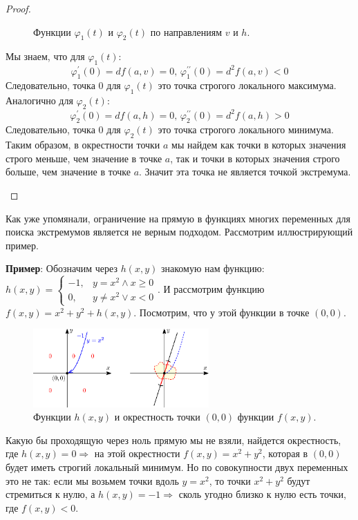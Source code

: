 \documentclass[12pt]{article}
\theoremstyle{definition}
\begin{document}
\begin{proof}
\begin{enumerate}[label ={(\arabic*)}]
\begin{figure}[H]
			\caption{Функции $\varphi_1(t)$ и $\varphi_2(t)$ по направлениям $v$ и $h$.}
			\label{18_3}
		\end{figure}
		Мы знаем, что для $\varphi_1(t)$:
		$$
			\varphi_1^\prime(0) = df(a,v) = 0, \, \varphi_1^{\prime\prime}(0) = d^2f(a,v) < 0
		$$ 
		Следовательно, точка $0$ для $\varphi_1(t)$ это точка строгого локального максимума. Аналогично для $\varphi_2(t)$: 
		$$
			\varphi_2^\prime(0) = df(a,h) = 0, \, \varphi_2^{\prime\prime}(0) = d^2f(a,h) > 0
		$$ 
		Следовательно, точка $0$ для $\varphi_2(t)$ это точка строгого локального минимума. Таким образом, в окрестности точки $a$ мы найдем как точки в которых значения строго меньше, чем значение в точке $a$, так и точки в которых значения строго больше, чем значение в точке $a$. Значит эта точка не является точкой экстремума.
	\end{enumerate}
\end{proof}

Как уже упомянали, ограничение на прямую в функциях многих переменных для поиска экстремумов является не верным подходом. Рассмотрим иллюстрирующий пример.

\textbf{Пример}: Обозначим через $h(x,y)$ знакомую нам функцию: $h(x,y) = 
	\begin{cases} 
		-1, & y = x^2 \wedge x \geq 0 \\ 
		0, & y \neq x^2 \vee x < 0 
	\end{cases}
$. И рассмотрим функцию $f(x,y) = x^2 + y^2 + h(x,y)$. Посмотрим, что у этой функции в точке $(0,0)$.
\begin{figure}[H]
	\centering
	\includegraphics[width=0.6\textwidth]{18_4.eps}
	\caption{Функции $h(x,y)$ и окрестность точки $(0,0)$ функции $f(x,y)$.}
	\label{18_4}
\end{figure}
Какую бы проходящую через ноль прямую мы не взяли, найдется окрестность, где $h(x,y) = 0 \Rightarrow$ на этой окрестности $f(x,y) = x^2 + y^2$, которая в $(0,0)$ будет иметь строгий локальный минимум. Но по совокупности двух переменных это не так: если мы возьмем точки вдоль $y = x^2$, то точки $x^2 + y^2$ будут стремиться к нулю, а $h(x,y) = -1 \Rightarrow$ сколь угодно близко к нулю есть точки, где $f(x,y) < 0$. 
\end{document}
